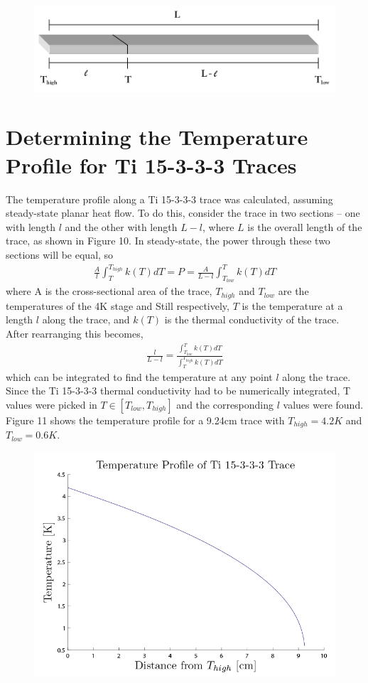 \documentclass{report}
\begin{document}
\begin{appendices}
\begin{figure}[h]
\centering
\includegraphics[width = .5\textwidth]{Ti15333_trace_resistivity_section.png}
\caption{}
\end{figure}

\section{Determining the Temperature Profile for Ti 15-3-3-3 Traces}
The temperature profile along a Ti 15-3-3-3 trace was calculated, assuming steady-state planar heat flow. To do this, consider the trace in two sections -- one with length $l$ and the other with length $L-l$, where $L$ is the overall length of the trace, as shown in Figure 10. In steady-state, the power through these two sections will be equal, so
\begin{eqnarray}
\frac{A}{l}\int_{T}^{T_{high}} k(T)dT = P = \frac{A}{L - l}\int_{T_{low}}^{T} k(T)dT
\end{eqnarray}
where A is the cross-sectional area of the trace, $T_{high}$ and $T_{low}$ are the temperatures of the 4K stage and Still respectively, $T$ is the temperature at a length $l$ along the trace, and $k(T)$ is the thermal conductivity of the trace. After rearranging this becomes,
\begin{eqnarray}
\frac{l}{L-l} = \frac{\int_{T_{low}}^{T} k(T)dT}{\int_{T}^{T_{high}} k(T)dT}
\end{eqnarray}
which can be integrated to find the temperature at any point $l$ along the trace. Since the Ti 15-3-3-3 thermal conductivity had to be numerically integrated, T values were picked in $T \in [T_{low},T_{high}]$ and the corresponding $l$ values were found. Figure 11 shows the temperature profile for a 9.24cm trace with $T_{high} = 4.2K$ and $T_{low}=0.6K$.

\begin{figure}[h]
\centering
\includegraphics[width = .5\textwidth]{Ti153_T_Profile.png}
\caption{}
\end{figure}


\end{appendices}
\end{document}
